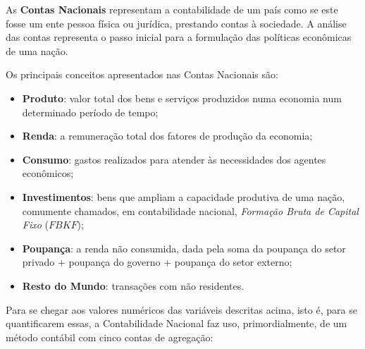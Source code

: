 \documentclass{article}\usepackage[]{graphicx}\usepackage[]{xcolor}
\begin{document}
As \textbf{Contas Nacionais} representam a contabilidade de um país como se este fosse um ente pessoa física ou jurídica,
prestando contas à sociedade. A análise das contas representa o passo inicial para a formulação das políticas
econômicas de uma nação.

Os principais conceitos apresentados nas Contas Nacionais são:

\begin{itemize}

  \item \textbf{Produto}: valor total dos bens e serviços produzidos numa economia num determinado período de tempo;

  \item \textbf{Renda}: a remuneração total dos fatores de produção da economia;

  \item \textbf{Consumo}: gastos realizados para atender às necessidades dos agentes econômicos;

  \item \textbf{Investimentos}: bens que ampliam a capacidade produtiva de uma nação, comumente chamados,
        em contabilidade nacional, \textit{Formação Bruta de Capital Fixo} (\(FBKF\));

  \item \textbf{Poupança}: a renda não consumida, dada pela soma da poupança do setor privado + poupança do governo +
        poupança do setor externo;

  \item \textbf{Resto do Mundo}: transações com não residentes.

\end{itemize}

Para se chegar aos valores numéricos das variáveis descritas acima, isto é, para se quantificarem essas,
a Contabilidade Nacional faz uso, primordialmente, de um método contábil com cinco contas de agregação:
\end{document}
